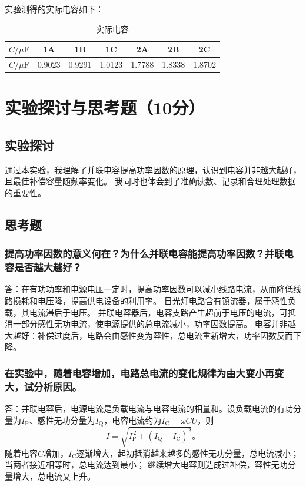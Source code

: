 \documentclass[10pt,a4paper]{ctexart} %
\begin{document}
  实验测得的实际电容如下：
  \begin{table}[H]
    \centering
    \caption{实际电容}
    \begin{tabular}{ccccccc}
      \toprule
      $C/\mu\mathrm{F}$ & 1A & 1B & 1C & 2A & 2B & 2C \\
      \midrule
      $C/\mu\mathrm{F}$ & 0.9023 & 0.9291 & 1.0123 & 1.7788 & 1.8338 & 1.8702 \\
      \bottomrule
    \end{tabular}
  \end{table}

\section{实验探讨与思考题（10分）}

  \subsection{实验探讨}
  通过本实验，我理解了并联电容提高功率因数的原理，认识到电容并非越大越好，且最佳补偿容量随频率变化。
  我同时也体会到了准确读数、记录和合理处理数据的重要性。

  \subsection{思考题}

    \subsubsection{提高功率因数的意义何在？为什么并联电容能提高功率因数？并联电容是否越大越好？}
    答：在有功功率和电源电压一定时，提高功率因数可以减小线路电流，从而降低线路损耗和电压降，提高供电设备的利用率。
    日光灯电路含有镇流器，属于感性负载，其电流滞后于电压。
    并联电容器后，电容支路产生超前于电压的电流，可抵消一部分感性无功电流，使电源提供的总电流减小，功率因数提高。
    电容并非越大越好：补偿过度后，电路会由感性变为容性，总电流重新增大，功率因数反而下降。

    \subsubsection{在实验中，随着电容增加，电路总电流的变化规律为由大变小再变大，试分析原因。}
    答：并联电容后，电源电流是负载电流与电容电流的相量和。设负载电流的有功分量为$I_{\mathrm P}$、感性无功分量为$I_{\mathrm Q}$，电容电流约为$I_{\mathrm C}=\omega CU$，则
    \[
    I=\sqrt{I_{\mathrm P}^{\,2}+(I_{\mathrm Q}-I_{\mathrm C})^{2}}。
    \]
    随着电容$C$增加，$I_{\mathrm C}$逐渐增大，起初抵消越来越多的感性无功分量，总电流减小；当两者接近相等时，总电流达到最小；
    继续增大电容则造成过补偿，容性无功分量增大，总电流又上升。
\end{document}
